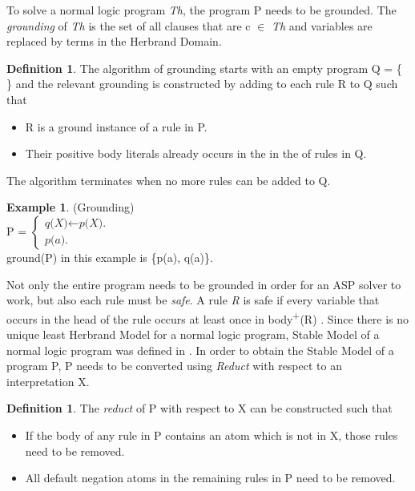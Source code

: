 \documentclass[12pt,twoside]{report}
\theoremstyle{plain}
\theoremstyle{definition}
\newtheorem{defn}[thm]{Definition} %
\newtheorem{examp}{Example}[section]
\begin{document}
To solve a normal logic program \textit{Th}, the program P needs to be grounded. The \textit{grounding} of \textit{Th} is the set of all clauses that are c $\in$ \textit{Th} and variables are replaced by terms in the Herbrand Domain.
\begin{defn}
The algorithm of grounding starts with an empty program Q = \{  \} and the relevant grounding is constructed by adding to each rule R to Q such that
\begin{itemize}
\item R is a ground instance of a rule in P.
\item Their positive body literals already occurs in the in the of rules in Q.
\end{itemize}
The algorithm terminates when no more rules can be added to Q.

\end{defn}

\begin{examp} \normalfont (Grounding) \\

P = $\begin{cases}
	\textit{q(X)}  \leftarrow \textit{p(X).} \\
	\textit{p(a).}
      \end{cases}$ \\

ground(P) in this example is \{p(a), q(a)\}.

\end{examp}
\label{grounding}

Not only the entire program needs to be grounded in order for an ASP solver to work, but also each rule must be \textit{safe}. A rule \textit{R} is safe if every variable that occurs in the head of the rule occurs at least once in body\textsuperscript{+}(R) .
Since there is no unique least Herbrand Model for a normal logic program, Stable Model of a normal logic program was defined in \cite{Gelfond1988}. In order to obtain the Stable Model of a program P, P needs to be converted using \textit{Reduct} with respect to an interpretation X.

\begin{defn}
The \textit{reduct} of P with respect to X can be constructed such that
\begin{itemize}
\item If the body of any rule in P contains an atom which is not in X, those rules need to be removed.
\item All default negation atoms in the remaining rules in P need to be removed.
\end{itemize}
\end{defn}
\end{document}
